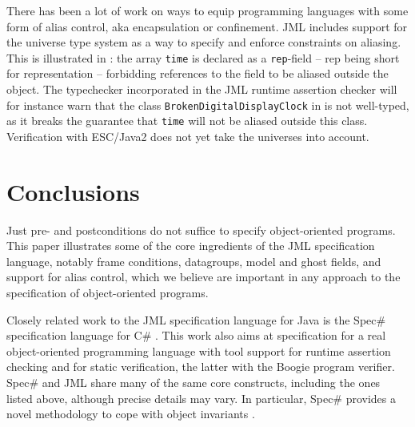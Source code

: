 \documentclass{llncs}
\begin{document}
There has been a lot of work on ways to equip programming languages
with some form of alias control, aka encapsulation or confinement.
JML includes support for the universe type system
\cite{Mueller-Poetzsch-Heffter-Leavens03} as a way to specify
and enforce constraints on aliasing. This is illustrated in 
: the array \texttt{time} is declared
as a \texttt{rep}-field -- rep being short for representation -- forbidding
references to the field to be aliased outside the object.
The typechecker incorporated in the JML runtime assertion checker
will for instance warn that the class \texttt{BrokenDigitalDisplayClock}
in  is not well-typed, as it  breaks 
the guarantee that \texttt{time} will not be aliased outside this class.
Verification with ESC/Java2 does not yet take the universes into account.

% 
%

\section{Conclusions}

Just pre- and postconditions do not suffice to specify object-oriented
programs.  This paper illustrates some of the core ingredients of the JML
specification language, notably frame conditions, datagroups, model and
ghost fields, and support for alias control, which we believe are important
in any approach to the specification of object-oriented programs.

Closely related work to the JML specification language for Java is the
Spec\# specification language for C\# \cite{SpecSharp}. This work also aims
at specification for a real object-oriented programming language with tool
support for runtime assertion checking and for static verification, the
latter with the Boogie program verifier.  Spec\# and JML share many of the
same core constructs, including the ones listed above, although precise
details may vary.  In particular, Spec\# provides a novel methodology to 
cope with object invariants \cite{BoogieInvariants}.
\end{document}
